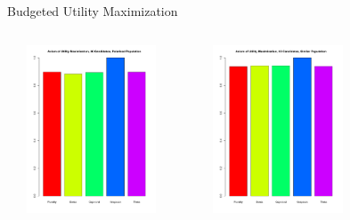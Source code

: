 \documentclass{beamer}
\begin{document}
\begin{frame}{Budgeted Utility Maximization}
	\begin{columns}
             \centering
             \includegraphics[height=5cm, width=5cm]{Presentation_Plots/Axiom of Utility Maximization, 20 Candidates, Polarized Population.pdf}
             
	 \centering
             \includegraphics[height=5cm, width=5cm]{Presentation_Plots/Axiom of Utility Maximization, 20 Candidates, Similar Population.pdf}
         \end{columns} 
\end{frame}
\end{document}
